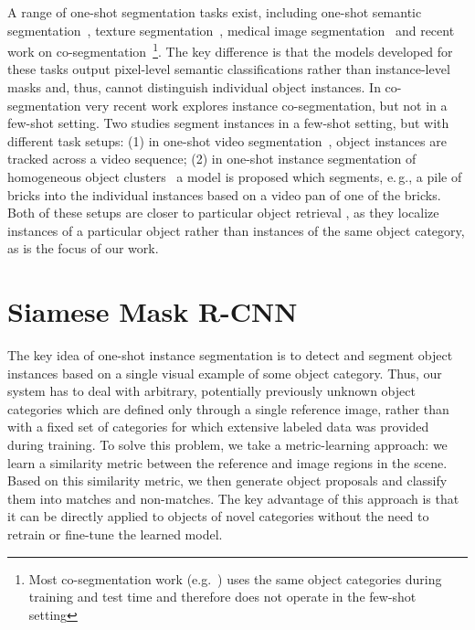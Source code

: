 \documentclass{article}
\begin{document}
A range of one-shot segmentation tasks exist, including one-shot semantic segmentation~\cite{Shaban2017,Rakelly2018, Dong2018a, Michaelis2018}, texture segmentation~\cite{Ustyuzhaninov2018}, medical image segmentation~\cite{Zhao2019} and recent work on co-segmentation~\cite{Li2018}\footnote{Most co-segmentation work (e.g.~\cite{Rother2006, Faktor2013}) uses the same object categories during training and test time and therefore does not operate in the few-shot setting}.
The key difference is that the models developed for these tasks output pixel-level semantic classifications rather than instance-level masks and, thus, cannot distinguish individual object instances. In co-segmentation very recent work \cite{Hsu2019} explores instance co-segmentation, but not in a few-shot setting.
Two studies segment instances in a few-shot setting, but with different task setups: (1) in one-shot video segmentation~\cite{Caelles2017, Caelles2019}, object instances are tracked across a video sequence; (2) in one-shot instance segmentation of homogeneous object clusters~\cite{wu2018annotation} a model is proposed which segments, e.\,g., a pile of bricks into the individual instances based on a video pan of one of the bricks. Both of these setups are closer to particular object retrieval \cite{Tolias2016, Salvador2016, Gordo2016}, as they localize instances of a particular object rather than instances of the same object category, as is the focus of our work.



\section{Siamese Mask R-CNN}
\label{sec:model}

The key idea of one-shot instance segmentation is to detect and segment object instances based on a single visual example of some object category. Thus, our system has to deal with arbitrary, potentially previously unknown object categories which are defined only through a single reference image, rather than with a fixed set of categories for which extensive labeled data was provided during training. To solve this problem, we take a metric-learning approach: we learn a similarity metric between the reference and image regions in the scene. Based on this similarity metric, we then generate object proposals and classify them into matches and non-matches. The key advantage of this approach is that it can be directly applied to objects of novel categories without the need to retrain or fine-tune the learned model.
\end{document}
